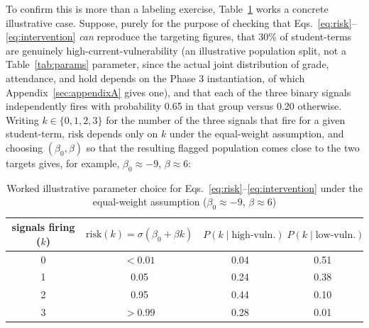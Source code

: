 \documentclass[11pt]{article}
\begin{document}
To confirm this is more than a labeling exercise, Table~\ref{tab:worked} works a concrete illustrative case. Suppose, purely for the purpose of checking that Eqs.~\ref{eq:risk}--\ref{eq:intervention} \emph{can} reproduce the targeting figures, that 30\% of student-terms are genuinely high-current-vulnerability (an illustrative population split, not a Table~\ref{tab:params} parameter, since the actual joint distribution of grade, attendance, and hold depends on the Phase 3 instantiation, of which Appendix~\ref{sec:appendixA} gives one), and that each of the three binary signals independently fires with probability 0.65 in that group versus 0.20 otherwise. Writing $k \in \{0,1,2,3\}$ for the number of the three signals that fire for a given student-term, $\text{risk}$ depends only on $k$ under the equal-weight assumption, and choosing $(\beta_0,\beta)$ so that the resulting flagged population comes close to the two targets gives, for example, $\beta_0 \approx -9$, $\beta \approx 6$:

\begin{table}[ht]
\caption{Worked illustrative parameter choice for Eqs.~\ref{eq:risk}--\ref{eq:intervention} under the equal-weight assumption ($\beta_0\approx-9$, $\beta\approx6$)}
\label{tab:worked}
\centering
\small
\begin{tabular}{@{}cccc@{}}
\toprule
signals firing ($k$) & $\text{risk}(k)=\sigma(\beta_0+\beta k)$ & $P(k \mid \text{high-vuln.})$ & $P(k \mid \text{low-vuln.})$ \\
\midrule
0 & $<0.01$ & 0.04 & 0.51 \\
1 & 0.05 & 0.24 & 0.38 \\
2 & 0.95 & 0.44 & 0.10 \\
3 & $>0.99$ & 0.28 & 0.01 \\
\bottomrule
\end{tabular}
\end{table}
\end{document}
